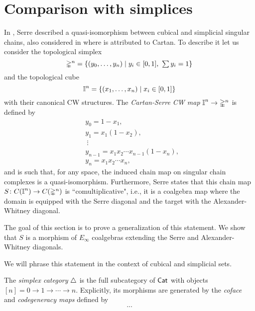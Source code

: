 
\section{Comparison with simplices}

In \cite[p. 442]{Serre1951homologie}, Serre described a quasi-isomorphism between cubical and simplicial singular chains, also considered in \cite[p.199]{Eilenberg1953acyclic} where is attributed to Cartan.
To describe it let us consider the topological simplex
\begin{equation*}
\mathbb{\Delta}^n = \{(y_0, \dots, y_n) \mid y_i \in [0,1], \ \textstyle{\sum} \, y_i = 1\}
\end{equation*}
and the topological cube
\begin{equation*}
\bm{\mathbb{I}}^{n} = \{(x_1, \dots, x_n) \mid x_i \in [0,1]\}
\end{equation*}
with their canonical CW structures.
The \textit{Cartan-Serre CW map} $\bm{\mathbb{I}}^n \to \mathbb{\Delta}^n$ is defined by
\begin{equation} \label{e:cartan-serre CW map}
\begin{split}
&y_0 = 1 - x_1, \\
&y_1 = x_1(1 - x_2), \\
&\ \vdots \\
&y_{n-1} = x_1 x_2 \cdots x_{n-1}(1-x_n), \\
&y_{n} = x_1 x_2 \cdots x_n,
\end{split}
\end{equation}
and is such that, for any space, the induced chain map on singular chain complexes is a quasi-isomorphism.
Furthermore, Serre states that this chain map $S \colon C(\bm{\mathbb{I}}^n) \to C(\mathbb{\Delta}^n)$ is ``comultiplicative", i.e., it is a coalgebra map where the domain is equipped with the Serre diagonal and the target with the Alexander-Whitney diagonal.

The goal of this section is to prove a generalization of this statement.
We show that $S$ is a morphism of $E_\infty$ coalgebras extending the Serre and Alexander-Whitney diagonals.

We will phrase this statement in the context of cubical and simplicial sets.

The \textit{simplex category} $\triangle$ is the full subcategory of $\mathsf{Cat}$ with objects $[n] = 0 \to 1 \to \cdots \to n$.
Explicitly, its morphisms are generated by the \textit{coface} and \textit{codegeneracy maps} defined by
\begin{align*}
...
\end{align*}

